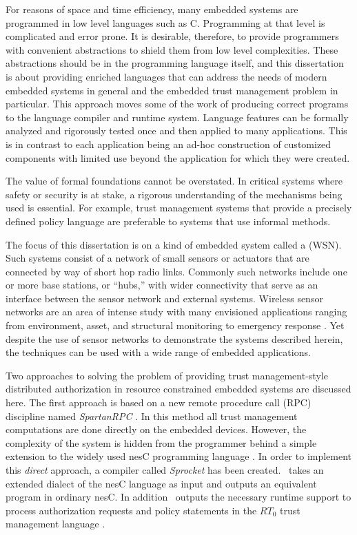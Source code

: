For reasons of space and time efficiency, many embedded systems are programmed in low level
languages such as C. Programming at that level is complicated and error prone. It is desirable,
therefore, to provide programmers with convenient abstractions to shield them from low level
complexities. These abstractions should be in the programming language itself, and this
dissertation is about providing enriched languages that can address the needs of modern embedded
systems in general and the embedded trust management problem in particular. This
 approach moves some of the work of producing correct programs to the
language compiler and runtime system. Language features can be formally analyzed and rigorously
tested once and then applied to many applications. This is in contrast to each application being
an ad-hoc construction of customized components with limited use beyond the application for
which they were created.

The value of formal foundations cannot be overstated. In critical systems where safety or
security is at stake, a rigorous understanding of the mechanisms being used is essential. For
example, trust management systems that provide a precisely defined policy language are
preferable to systems that use informal methods.

The focus of this dissertation is on a kind of embedded system called a  (WSN). Such systems consist of a network of small sensors or actuators that are
connected by way of short hop radio links. Commonly such networks include one or more base
stations, or ``hubs,'' with wider connectivity that serve as an interface between the sensor
network and external systems. Wireless sensor networks are an area of intense study with many
envisioned applications ranging from environment, asset, and structural monitoring to emergency
response \cite{Culler:2004:GEI:1018015.1018072,1038146}. Yet despite the use of sensor networks
to demonstrate the systems described herein, the techniques can be used with a wide range of
embedded applications.

Two approaches to solving the problem of providing trust management-style distributed
authorization in resource constrained embedded systems are discussed here. The first approach is
based on a new remote procedure call (RPC) discipline named \textit{SpartanRPC}
\cite{chapin-skalka-SpartanRPC,chapin-skalka-SpartanRPCTR}. In this method all trust management
computations are done directly on the embedded devices. However, the complexity of the system is
hidden from the programmer behind a simple extension to the widely used nesC programming
language \cite{Gay-nesC-2003}. In order to implement this \emph{direct} approach, a compiler
called \textit{Sprocket} has been created. \Sprocket\ takes an extended dialect of the nesC
language as input and outputs an equivalent program in ordinary nesC. In addition \Sprocket\
outputs the necessary runtime support to process authorization requests and policy statements in
the $RT_0$ trust management language \cite{Li:DRBTMF,Li:RRBTMF}.

